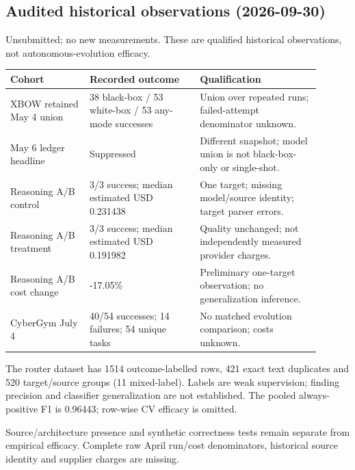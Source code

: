 \subsection{Audited historical observations (2026-09-30)}
Unsubmitted; no new measurements. These are qualified historical observations, not autonomous-evolution efficacy.
\begin{center}\small
\begin{tabular}{p{0.23\linewidth}p{0.32\linewidth}p{0.35\linewidth}}
\toprule
Cohort & Recorded outcome & Qualification \\
\midrule
XBOW retained May 4 union & 38 black-box / 53 white-box / 53 any-mode successes & Union over repeated runs; failed-attempt denominator unknown. \\
May 6 ledger headline & Suppressed & Different snapshot; model union is not black-box-only or single-shot. \\
Reasoning A/B control & 3/3 success; median estimated USD 0.231438 & One target; missing model/source identity; target parser errors. \\
Reasoning A/B treatment & 3/3 success; median estimated USD 0.191982 & Quality unchanged; not independently measured provider charges. \\
Reasoning A/B cost change & -17.05\% & Preliminary one-target observation; no generalization inference. \\
CyberGym July 4 & 40/54 successes; 14 failures; 54 unique tasks & No matched evolution comparison; costs unknown. \\
\bottomrule
\end{tabular}
\end{center}
The router dataset has 1514 outcome-labelled rows, 421 exact text duplicates and 520 target/source groups (11 mixed-label). Labels are weak supervision; finding precision and classifier generalization are not established. The pooled always-positive F1 is 0.96443; row-wise CV efficacy is omitted.\par
Source/architecture presence and synthetic correctness tests remain separate from empirical efficacy. Complete raw April run/cost denominators, historical source identity and supplier charges are missing.\par

